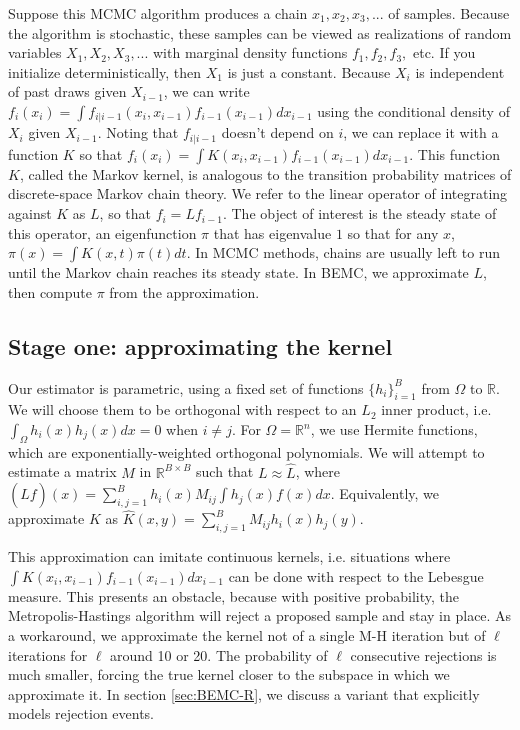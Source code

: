 \documentclass{article}
\begin{document}
Suppose this MCMC algorithm produces a chain $ x_1, x_2, x_3, ...$ of samples. Because the algorithm is stochastic, these samples can be viewed as realizations of random variables $X_1, X_2, X_3, ...$ with marginal density functions $f_1, f_2, f_3, $ etc. If you initialize deterministically, then $X_1$ is just a constant. Because $X_i$ is independent of past draws given $X_{i-1}$, we can write $f_i(x_i) = \int f_{i|i-1}(x_{i},x_{i-1})f_{i-1}(x_{i-1})dx_{i-1}$ using the conditional density of $X_i$ given $X_{i-1}$. Noting that $f_{i|i-1}$ doesn't depend on $i$, we can replace it with a function $K$ so that $f_i(x_i) = \int K(x_i, x_{i-1})f_{i-1}(x_{i-1})dx_{i-1}$. This function $K$, called the Markov kernel, is analogous to the transition probability matrices of discrete-space Markov chain theory. We refer to the linear operator of integrating against $K$ as $L$, so that $f_{i} = Lf_{i-1}$. The object of interest is the steady state of this operator, an eigenfunction $\pi$ that has eigenvalue $1$ so that for any $x$, $\pi(x) = \int K(x, t)\pi(t)dt$. In MCMC methods, chains are usually left to run until the Markov chain reaches its steady state. In BEMC, we approximate $L$, then compute $\pi$ from the approximation. 

\subsection{Stage one: approximating the kernel}
\label{sec:BEMC}
Our estimator is parametric, using a fixed set of functions $\{h_i\}_{i=1}^B$ from $\Omega$ to $\mathbb{R}$. We will choose them to be orthogonal with respect to an $L_2$ inner product, i.e. $\int_{\Omega} h_i(x)h_j(x)dx = 0$ when $i \neq j$. For $\Omega=\mathbb{R}^n$, we use Hermite functions, which are exponentially-weighted orthogonal polynomials. We will attempt to estimate a matrix $M$ in $\mathbb{R}^{B\times B}$ such that $L \approx \hat{L}$, where $(\hat{L}f)(x) =\sum_{i,j=1}^B h_i(x)M_{ij}\int h_j(x)f(x)dx$. Equivalently, we approximate $K$ as $\hat{K}(x,y) = \sum_{i,j=1}^B M_{ij} h_i(x)h_j(y)$. 

This approximation can imitate continuous kernels, i.e. situations where $\int K(x_i, x_{i-1})f_{i-1}(x_{i-1})dx_{i-1}$ can be done with respect to the Lebesgue measure. This presents an obstacle, because with positive probability, the Metropolis-Hastings algorithm will reject a proposed sample and stay in place. As a workaround, we approximate the kernel not of a single M-H iteration but of $\ell$ iterations for $\ell$ around 10 or 20. The probability of $\ell$ consecutive rejections is much smaller, forcing the true kernel closer to the subspace in which we approximate it. In section \ref{sec:BEMC-R}, we discuss a variant that explicitly models rejection events.
\end{document}

